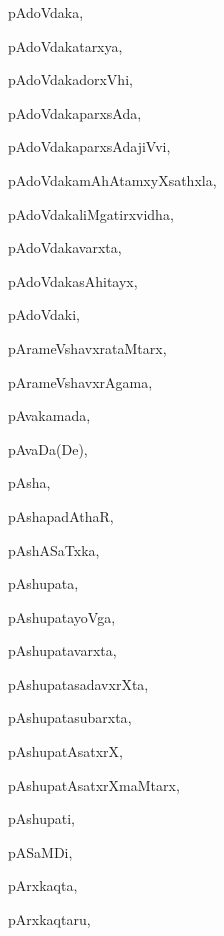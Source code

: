 \begin{multicols}{3}
{\noindent
{pAdoVdaka}, \pageref{pAdoVdaka}

\noindent
{pAdoVdakatarxya}, \pageref{pAdoVdakatarxya}

\noindent
{pAdoVdakadorxVhi}, \pageref{pAdoVdakadorxVhi}

\noindent
{pAdoVdakaparxsAda}, \pageref{pAdoVdakaparxsAda}

\noindent
{pAdoVdakaparxsAdajiVvi}, \pageref{pAdoVdakaparxsAdajiVvi}

\noindent
{pAdoVdakamAhAtamxyXsathxla}, \pageref{pAdoVdakamAhAtamxyXsathxla}

\noindent
{pAdoVdakaliMgatirxvidha}, \pageref{pAdoVdakaliMgatirxvidha}

\noindent
{pAdoVdakavarxta}, \pageref{pAdoVdakavarxta}

\noindent
{pAdoVdakasAhitayx}, \pageref{pAdoVdakasAhitayx}

\noindent
{pAdoVdaki}, \pageref{pAdoVdaki}

\noindent
{pArameVshavxrataMtarx}, \pageref{pArameVshavxrataMtarx}

\noindent
{pArameVshavxrAgama}, \pageref{pArameVshavxrAgama}

\noindent
{pAvakamada}, \pageref{pAvakamada}

\noindent
{pAvaDa(De)}, \pageref{pAvaDaDe}

\noindent
{pAsha}, \pageref{pAsha}

\noindent
{pAshapadAthaR}, \pageref{pAshapadAthaR}

\noindent
{pAshASaTxka}, \pageref{pAshASaTxka}

\noindent
{pAshupata}, \pageref{pAshupata}

\noindent
{pAshupatayoVga}, \pageref{pAshupatayoVga}

\noindent
{pAshupatavarxta}, \pageref{pAshupatavarxta}

\noindent
{pAshupatasadavxrXta}, \pageref{pAshupatasadavxrXta}

\noindent
{pAshupatasubarxta}, \pageref{pAshupatasubarxta}

\noindent
{pAshupatAsatxrX}, \pageref{pAshupatAsatxrX}

\noindent
{pAshupatAsatxrXmaMtarx}, \pageref{pAshupatAsatxrXmaMtarx}

\noindent
{pAshupati}, \pageref{pAshupati}

\noindent
{pASaMDi}, \pageref{pASaMDi}

\noindent
{pArxkaqta}, \pageref{pArxkaqta}

\noindent
{pArxkaqtaru}, \pageref{pArxkaqtaru}

}
\end{multicols}
